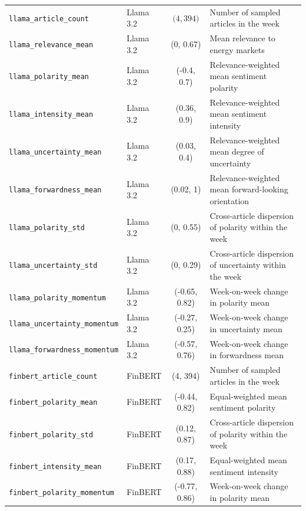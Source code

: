 \documentclass[preprint,12pt,authoryear]{elsarticle}
\begin{document}
\begin{longtable}{llcp{5.5cm}}
\texttt{llama\_article\_count}        & Llama 3.2 & ${(}4, 394{)}$ & Number of sampled articles in the week \\
\texttt{llama\_relevance\_mean}       & Llama 3.2 & {(}0, 0.67{)}     & Mean relevance to energy markets \\
\texttt{llama\_polarity\_mean}        & Llama 3.2 & {(}-0.4, 0.7{)}    & Relevance-weighted mean sentiment polarity \\
\texttt{llama\_intensity\_mean}       & Llama 3.2 & {(}0.36, 0.9{)}     & Relevance-weighted mean sentiment intensity \\
\texttt{llama\_uncertainty\_mean}     & Llama 3.2 & {(}0.03, 0.4{)}     & Relevance-weighted mean degree of uncertainty \\
\texttt{llama\_forwardness\_mean}     & Llama 3.2 & {(}0.02, 1{)}     & Relevance-weighted mean forward-looking orientation \\
\texttt{llama\_polarity\_std}         & Llama 3.2 & {(}0, 0.55{)}     & Cross-article dispersion of polarity within the week \\
\texttt{llama\_uncertainty\_std}      & Llama 3.2 & {(}0, 0.29{)}     & Cross-article dispersion of uncertainty within the week \\
\texttt{llama\_polarity\_momentum}    & Llama 3.2 & {(}-0.65, 0.82{)}    & Week-on-week change in  polarity mean \\
\texttt{llama\_uncertainty\_momentum} & Llama 3.2 & {(}-0.27, 0.25{)}    & Week-on-week change in  uncertainty mean \\
\texttt{llama\_forwardness\_momentum} & Llama 3.2 & {(}-0.57, 0.76{)}    & Week-on-week change in forwardness mean \\
\hline

\texttt{finbert\_article\_count}        & FinBERT & {(}4, 394{)} & Number of sampled articles in the week \\
\texttt{finbert\_polarity\_mean}        & FinBERT & {(}-0.44, 0.82{)}    & Equal-weighted mean sentiment polarity \\
\texttt{finbert\_polarity\_std}         & FinBERT & {(}0.12, 0.87{)}     & Cross-article dispersion of polarity within the week \\
\texttt{finbert\_intensity\_mean}       & FinBERT & {(}0.17, 0.88{)}     & Equal-weighted mean sentiment intensity \\
\texttt{finbert\_polarity\_momentum}    & FinBERT & {(}-0.77, 0.86{)}    & Week-on-week change in polarity mean  \\
\hline


\end{longtable}
\end{document}
